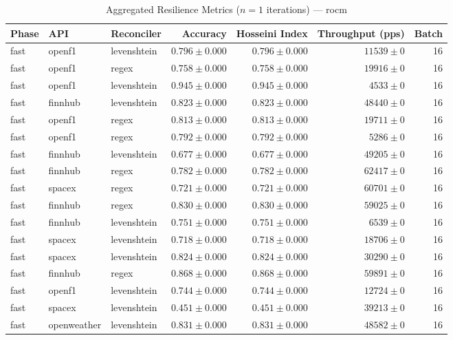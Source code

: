 
\begin{table}[htbp]
\caption{Aggregated Resilience Metrics ($n=1$ iterations) --- rocm}
\begin{tabular}{l l l r r r r}
\hline
Phase & API & Reconciler & Accuracy & Hosseini Index & Throughput (pps) & Batch \\
\hline
fast & openf1 & levenshtein & $0.796\pm0.000$ & $0.796\pm0.000$ & $11539\pm0$ & 16 \\
fast & openf1 & regex & $0.758\pm0.000$ & $0.758\pm0.000$ & $19916\pm0$ & 16 \\
fast & openf1 & levenshtein & $0.945\pm0.000$ & $0.945\pm0.000$ & $4533\pm0$ & 16 \\
fast & finnhub & levenshtein & $0.823\pm0.000$ & $0.823\pm0.000$ & $48440\pm0$ & 16 \\
fast & openf1 & regex & $0.813\pm0.000$ & $0.813\pm0.000$ & $19711\pm0$ & 16 \\
fast & openf1 & regex & $0.792\pm0.000$ & $0.792\pm0.000$ & $5286\pm0$ & 16 \\
fast & finnhub & levenshtein & $0.677\pm0.000$ & $0.677\pm0.000$ & $49205\pm0$ & 16 \\
fast & finnhub & regex & $0.782\pm0.000$ & $0.782\pm0.000$ & $62417\pm0$ & 16 \\
fast & spacex & regex & $0.721\pm0.000$ & $0.721\pm0.000$ & $60701\pm0$ & 16 \\
fast & finnhub & regex & $0.830\pm0.000$ & $0.830\pm0.000$ & $59025\pm0$ & 16 \\
fast & finnhub & levenshtein & $0.751\pm0.000$ & $0.751\pm0.000$ & $6539\pm0$ & 16 \\
fast & spacex & levenshtein & $0.718\pm0.000$ & $0.718\pm0.000$ & $18706\pm0$ & 16 \\
fast & spacex & levenshtein & $0.824\pm0.000$ & $0.824\pm0.000$ & $30290\pm0$ & 16 \\
fast & finnhub & regex & $0.868\pm0.000$ & $0.868\pm0.000$ & $59891\pm0$ & 16 \\
fast & openf1 & levenshtein & $0.744\pm0.000$ & $0.744\pm0.000$ & $12724\pm0$ & 16 \\
fast & spacex & levenshtein & $0.451\pm0.000$ & $0.451\pm0.000$ & $39213\pm0$ & 16 \\
fast & openweather & levenshtein & $0.831\pm0.000$ & $0.831\pm0.000$ & $48582\pm0$ & 16 \\

\end{tabular}
\end{table}
